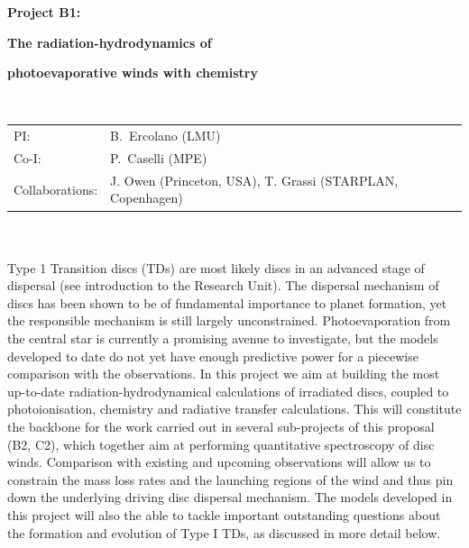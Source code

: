 \documentclass[10pt,fleqn,twoside]{article}
\begin{document}
\newpage


\setcounter{page}{1}

\centerline{\huge\bf\Tcol
%
%
%
%
%
 Project B1:}
\vspace{1em}

\centerline{\LARGE\bf\Tcol The radiation-hydrodynamics of}\vspace{0.3em}
\centerline{\LARGE\bf\Tcol photoevaporative winds with chemistry}

%
%
%
%
%
\vskip1.0cm

\\
\begin{tabular}{ll}
{\textsf{PI:}}                  & B.~Ercolano (LMU)\\
{\textsf{Co-I:}}                &P.~Caselli (MPE)\\
{\textsf{Collaborations:}}      & J. Owen (Princeton, USA), T. Grassi (STARPLAN, Copenhagen)  \
\end{tabular}


\vspace{1em}
 \\

\vspace{1em}
\\
Type 1 Transition discs (TDs) are most likely discs in an advanced stage of dispersal
(see introduction to the Research Unit). The
dispersal mechanism of discs has been shown to be of fundamental importance to planet
formation, yet the responsible mechanism is still largely
unconstrained. Photoevaporation from the central star is currently a
promising avenue to investigate, but the models developed to date do
not yet have enough predictive power for a piecewise comparison with
the observations. In this project we aim at building the most
up-to-date radiation-hydrodynamical calculations of irradiated discs, 
coupled to photoionisation, chemistry and radiative transfer
calculations. This will constitute the backbone for the work carried
out in several sub-projects of this proposal (B2, C2), which together
aim at performing quantitative
spectroscopy of disc winds. Comparison with existing and upcoming
observations will allow us to constrain the mass loss rates and the
launching regions of the wind and thus pin down the underlying driving disc
dispersal mechanism. 
The models developed in this project will also the able to tackle
important outstanding questions about the formation and evolution of
Type I TDs, as discussed in more detail below. 
\end{document}
